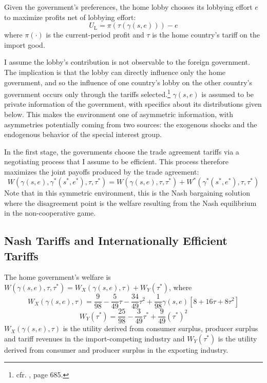 \documentclass[12pt]{article}
\newtheorem{assumption}{Assumption}
\newcommand{\ga}{\gamma}
\begin{document}


Given the government's preferences, the home lobby chooses its lobbying effort $e$ to maximize profits net of lobbying effort:
\begin{equation}
  U_\text{L} = \pi(\tau(\ga(s,e))) - e
  \label{eq:lv3}
\end{equation}
where $\pi(\cdot)$ is the current-period profit and $\tau$ is the home country's tariff on the import good. %

I assume the lobby's contribution is not observable to the foreign government. The implication is that the lobby can directly influence only the home government, and so the influence of one country's lobby on the other country's government occurs only through the tariffs selected.\footnote{cfr. \Textcite{gh95}, page 685.} $\ga(s,e)$ is assumed to be private information of the government, with specifics about its distributions given below. This makes the environment one of asymmetric information, with asymmetries potentially coming from two sources: the exogenous shocks and the endogenous behavior of the special interest group.

In the first stage, the governments choose the trade agreement tariffs via a negotiating process that I assume to be efficient. This process therefore maximizes the joint payoffs produced by the trade agreement:
\begin{equation}
  W(\ga(s,e),\ga^*(s^*,e^*),\tau,\tau^*) = W(\ga(s,e),\tau,\tau^*) + W^*(\ga^*(s^*,e^*),\tau,\tau^*)
  \label{eq:jv}
\end{equation}
Note that in this symmetric environment, this is the Nash bargaining solution where the disagreement point is the welfare resulting from the Nash equilibrium in the non-cooperative game.


\subsection{Nash Tariffs and Internationally Efficient Tariffs}
\label{sec:nasheff}
The home government's welfare is $W(\ga(s,e),\tau,\tau^*) = W_X(\ga(s,e),\tau) +W_Y(\tau^*)$, where
\[
  W_X(\ga(s,e),\tau) = \frac{9}{98} - \frac{5}{49}\tau - \frac{34}{49}\tau^2 +\frac{1}{98}\ga(s,e)\left[ 8 + 16\tau + 8\tau^2 \right]
\]
\[
  W_Y(\tau^*) = \frac{25}{98} - \frac{3}{49}\tau^* + \frac{9}{49}(\tau^*)^2 
\]
$W_X(\ga(s,e),\tau)$ is the utility derived from consumer surplus, producer surplus and tariff revenues in the import-competing industry and $W_Y(\tau^*)$ is the utility derived from consumer and producer surplus in the exporting industry.
\end{document}
